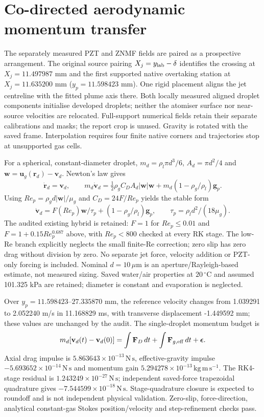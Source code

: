 \section{Co-directed aerodynamic momentum transfer}
The separately measured PZT and ZNMF fields are paired as a prospective arrangement.
The original source pairing $X_j=y_{\rm lab}-\delta$ identifies the crossing at
$X_j=11.497987$ mm and the first supported native overtaking station at $X_j=11.635200$ mm
($y_p=11.598423$ mm). One rigid placement aligns the jet centreline with the fitted plume axis
there. Both locally measured aligned droplet components initialise developed droplets;
neither the atomiser surface nor near-source velocities are relocated. Full-support
numerical fields retain their separate calibrations and masks; the report crop is unused.
Gravity is rotated with the saved frame. Interpolation requires four finite native corners
and trajectories stop at unsupported gas cells.

For a spherical, constant-diameter droplet,
$m_d=\rho_l\pi d^3/6$, $A_d=\pi d^2/4$ and
$\mathbf w=\mathbf u_g(\mathbf r_d)-\mathbf v_d$. Newton's law gives
\[
 \dot{\mathbf r}_d=\mathbf v_d,\qquad
 m_d\dot{\mathbf v}_d=\tfrac12\rho_g C_D A_d|\mathbf w|\mathbf w
 +m_d(1-\rho_g/\rho_l)\mathbf g_p.
\]
Using $Re_p=\rho_gd|\mathbf w|/\mu_g$ and $C_D=24F/Re_p$ yields the stable form
\[
 \dot{\mathbf v}_d=F(Re_p)\mathbf w/\tau_p+(1-\rho_g/\rho_l)\mathbf g_p,
 \qquad \tau_p=\rho_ld^2/(18\mu_g).
\]
The audited existing hybrid is retained: $F=1$ for $Re_p\le0.01$ and
$F=1+0.15Re_p^{0.687}$ above, with $Re_p<800$ checked at every RK stage.
The low-Re branch explicitly neglects the small finite-Re correction; zero slip has zero
drag without division by zero. No separate jet force, velocity addition or PZT-only
forcing is included. Nominal $d=10\,\mu\mathrm m$ is an aperture/Rayleigh-based estimate,
not measured sizing. Saved water/air properties at $20\,{}^\circ\mathrm C$ and assumed
101.325 kPa are retained; diameter is constant and evaporation is neglected.

Over $y_p=11.598423$--$27.335870$ mm, the reference velocity changes from 1.039291 to 2.052240 m/s
in 11.168829 ms, with transverse displacement -1.449592 mm; these values are unchanged by the audit.
The single-droplet momentum budget is
\[
 m_d[\mathbf v_d(t)-\mathbf v_d(0)]=\int\mathbf F_D\,dt+
 \int\mathbf F_{g,\rm eff}\,dt+\boldsymbol\epsilon.
\]
Axial drag impulse is $5.863643\times10^{-13}\,\mathrm{N\,s}$, effective-gravity impulse
$-5.693652\times10^{-14}\,\mathrm{N\,s}$ and momentum gain $5.294278\times10^{-13}\,\mathrm{kg\,m\,s^{-1}}$.
The RK4-stage residual is $1.243249\times10^{-27}\,\mathrm{N\,s}$; independent saved-force trapezoidal
quadrature gives $-7.544599\times10^{-18}\,\mathrm{N\,s}$. Stage-quadrature closure is expected to
roundoff and is not independent physical validation. Zero-slip, force-direction,
analytical constant-gas Stokes position/velocity and step-refinement checks pass.

